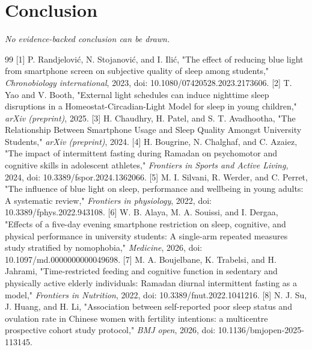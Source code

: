 \documentclass[conference]{IEEEtran}
\begin{document}
\section{Conclusion}
\textit{No evidence-backed conclusion can be drawn.}

\begin{thebibliography}{99}
 [1] P. Randjelović, N. Stojanović, and I. Ilić, "The effect of reducing blue light from smartphone screen on subjective quality of sleep among students," \textit{Chronobiology international}, 2023, doi: 10.1080/07420528.2023.2173606.
 [2] T. Yao and V. Booth, "External light schedules can induce nighttime sleep disruptions in a Homeostat-Circadian-Light Model for sleep in young children," \textit{arXiv (preprint)}, 2025.
 [3] H. Chaudhry, H. Patel, and S. T. Avadhootha, "The Relationship Between Smartphone Usage and Sleep Quality Amongst University Students," \textit{arXiv (preprint)}, 2024.
 [4] H. Bougrine, N. Chalghaf, and C. Azaiez, "The impact of intermittent fasting during Ramadan on psychomotor and cognitive skills in adolescent athletes," \textit{Frontiers in Sports and Active Living}, 2024, doi: 10.3389/fspor.2024.1362066.
 [5] M. I. Silvani, R. Werder, and C. Perret, "The influence of blue light on sleep, performance and wellbeing in young adults: A systematic review," \textit{Frontiers in physiology}, 2022, doi: 10.3389/fphys.2022.943108.
 [6] W. B. Alaya, M. A. Souissi, and I. Dergaa, "Effects of a five-day evening smartphone restriction on sleep, cognitive, and physical performance in university students: A single-arm repeated measures study stratified by nomophobia," \textit{Medicine}, 2026, doi: 10.1097/md.0000000000049698.
 [7] M. A. Boujelbane, K. Trabelsi, and H. Jahrami, "Time-restricted feeding and cognitive function in sedentary and physically active elderly individuals: Ramadan diurnal intermittent fasting as a model," \textit{Frontiers in Nutrition}, 2022, doi: 10.3389/fnut.2022.1041216.
 [8] N. J. Su, J. Huang, and H. Li, "Association between self-reported poor sleep status and ovulation rate in Chinese women with fertility intentions: a multicentre prospective cohort study protocol," \textit{BMJ open}, 2026, doi: 10.1136/bmjopen-2025-113145.
\end{thebibliography}
\end{document}
